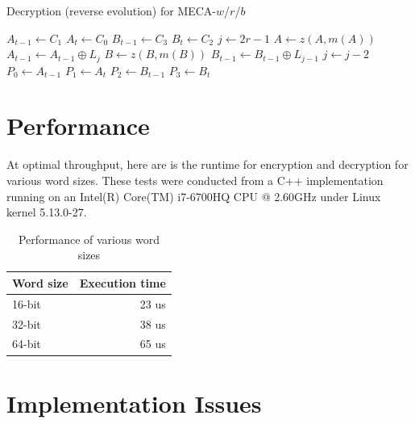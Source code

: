 \documentclass{article}
\begin{document}
\begin{algorithm}[H]
  \begin{algorithmic}
    \caption{Decryption (reverse evolution) for MECA-$w$/$r$/$b$}\label{alg:decryption}
    \Input
    \EndInput
    \Output
    \EndOutput
    \State $A_{t-1} \gets C_1$
    \State $A_{t} \gets C_0$
	\State $B_{t-1} \gets C_3$
	\State $B_{t} \gets C_2$
	\State $j \gets 2r-1$
		\State $A \gets z(A, m(A))$
		\State $A_{t-1} \gets A_{t-1} \oplus L_j$
		\State $B \gets z(B, m(B))$
		\State $B_{t-1} \gets B_{t-1} \oplus L_{j-1}$
		\State $j \gets j - 2$
    \EndFor
    \State $P_0 \gets A_{t-1}$
    \State $P_1 \gets A_{t}$
    \State $P_2 \gets B_{t-1}$
    \State $P_3 \gets B_{t}$
  \end{algorithmic}
\end{algorithm}

\section{Performance}

At optimal throughput, here are is the runtime for encryption and decryption for various word sizes. These tests were conducted from a C++ implementation running on an Intel(R) Core(TM) i7-6700HQ CPU @ 2.60GHz under Linux kernel 5.13.0-27.


\begin{table}[h!]
  \begin{center}
    \caption{Performance of various word sizes}
    \label{tab:performance}
    \begin{tabular}{l|r} %
      \textbf{Word size} & \textbf{Execution time}\\
      \hline
      16-bit & 23 us\\
      32-bit & 38 us\\
      64-bit & 65 us\\
    \end{tabular}
  \end{center}
\end{table}

\section{Implementation Issues}
\end{document}
